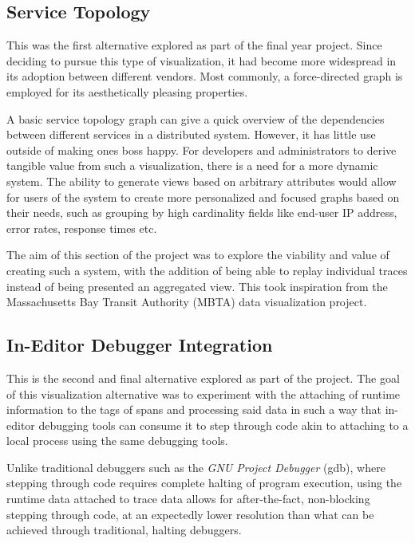 \documentclass[pdftex,titlepage]{article}
\begin{document}
        \subsection{Service Topology}
        This was the first alternative explored as part of the final year project. Since deciding to pursue this type of visualization,
        it had become more widespread in its adoption between different vendors\cite{risingstacktopo}\cite{kialitopo}. Most commonly, 
        a force-directed graph is employed for its aesthetically pleasing properties.

        A basic service topology graph can give a quick overview of the dependencies between different services in a distributed
        system. However, it has little use outside of making ones boss happy. For developers and administrators to derive tangible
        value from such a visualization, there is a need for a more dynamic system. The ability to generate views based on arbitrary
        attributes would allow for users of the system to create more personalized and focused graphs based on their needs,
        such as grouping by high cardinality fields like end-user IP address, error rates, response times etc\cite{doingitwrongtopo}.

        The aim of this section of the project was to explore the viability and value of creating such a system, with the addition
        of being able to replay individual traces instead of being presented an aggregated view. This took inspiration from the
        Massachusetts Bay Transit Authority (MBTA) data visualization project\cite{mbta}.

        \subsection{In-Editor Debugger Integration}
        This is the second and final alternative explored as part of the project. The goal of this visualization alternative was to
        experiment with the attaching of runtime information to the tags of spans and processing said data in such a way that in-editor
        debugging tools can consume it to step through code akin to attaching to a local process using the same debugging tools.

        Unlike traditional debuggers such as the \textit{GNU Project Debugger} (gdb), where stepping through code requires complete
        halting of program execution, using the runtime data attached to trace data allows for after-the-fact, non-blocking stepping
        through code, at an expectedly lower resolution than what can be achieved through traditional, halting debuggers.
\end{document}
